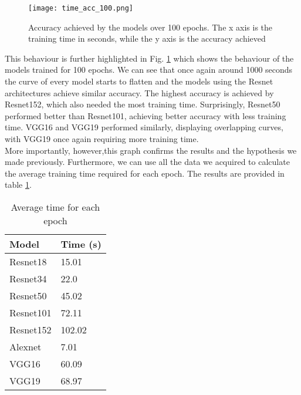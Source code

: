 \begin{figure}[h]
       \centering 
	    \texttt{[image: time\_acc\_100.png]}
        \caption[Accuracy achieved by the models over 100 epochs]{Accuracy achieved by the models over 100 epochs. The x axis is the training time in seconds, while the y axis is the accuracy achieved}
         \label{fig:time_acc_100}
\end{figure}




This behaviour is further highlighted in Fig. \ref{fig:time_acc_100} which shows the behaviour of the models trained for 100 epochs. We can see that once again around 1000 seconds the curve of every model starts to flatten and the models using the Resnet architectures achieve similar accuracy. The highest accuracy is achieved by Resnet152, which also needed the most training time. Surprisingly, Resnet50 performed better than Resnet101, achieving better accuracy with less training time.
VGG16 and VGG19 performed similarly, displaying overlapping curves, with VGG19 once again requiring more training time. \\
More importantly, however,this graph confirms the results and the hypothesis we made previously. Furthermore, we can use all the data we acquired to calculate the average training time required for each epoch. The results are provided in table \ref{tab:time_f_epoch}.
\begin{table}[h]
\centering
\begin{tabular}{ p{2cm} p{2cm}   }
 Model&Time (s)\\
 \hline
Resnet18&15.01\\
Resnet34&22.0\\
Resnet50&45.02\\
Resnet101&72.11\\
Resnet152&102.02\\
Alexnet&7.01\\
VGG16&60.09\\
VGG19&68.97\\
 \hline
\end{tabular}
\caption{Average time for each epoch}
\label{tab:time_f_epoch}
\end{table}

